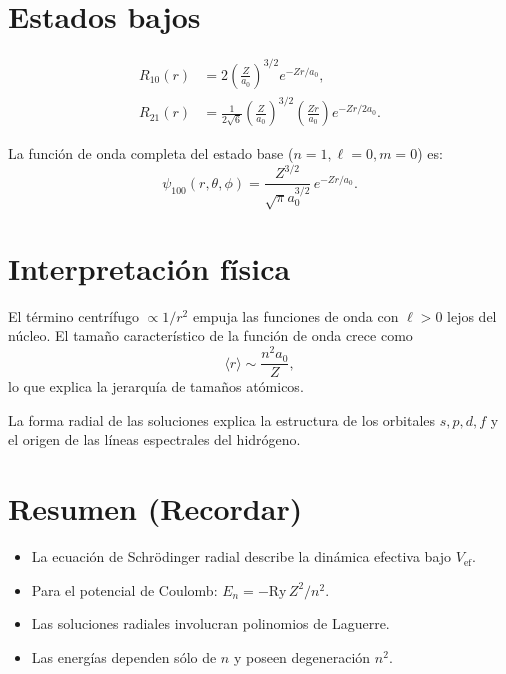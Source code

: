 \documentclass[11pt]{article}
\begin{document}
\section{Estados bajos}
\label{sec:low-states}

\begin{align*}
R_{10}(r) &= 2\left(\frac{Z}{a_0}\right)^{3/2} e^{-Zr/a_0}, \\
R_{21}(r) &= \frac{1}{2\sqrt{6}}\left(\frac{Z}{a_0}\right)^{3/2}
\left(\frac{Zr}{a_0}\right)e^{-Zr/2a_0}.
\end{align*}

La función de onda completa del estado base (\(n=1,\ell=0,m=0\)) es:
\[
\psi_{100}(r,\theta,\phi)
= \frac{Z^{3/2}}{\sqrt{\pi}a_0^{3/2}}\,e^{-Zr/a_0}.
\]

\section{Interpretación física}
\label{sec:interpretacion}

El término centrífugo \(\propto 1/r^2\) empuja las funciones de onda con
\(\ell>0\) lejos del núcleo. El tamaño característico de la función de onda
crece como
\[
\langle r\rangle \sim \frac{n^2 a_0}{Z},
\]
lo que explica la jerarquía de tamaños atómicos.  

La forma radial de las soluciones explica la estructura de los orbitales \(s,p,d,f\)
y el origen de las líneas espectrales del hidrógeno.

\section*{Resumen (Recordar)}
\begin{itemize}
\item La ecuación de Schrödinger radial describe la dinámica efectiva bajo \(V_{\text{ef}}\).
\item Para el potencial de Coulomb: \(E_n = -\mathrm{Ry}\,Z^2/n^2\).
\item Las soluciones radiales involucran polinomios de Laguerre.
\item Las energías dependen sólo de \(n\) y poseen degeneración \(n^2\).
\end{itemize}
\end{document}
